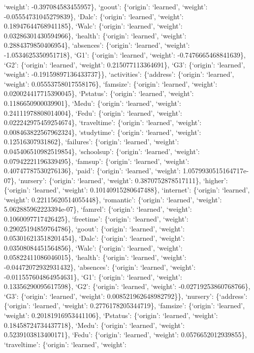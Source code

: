 \documentclass[
]{article}
\begin{document}
`weight': -0.397084583455957\}, `goout': \{`origin': `learned',
`weight': -0.05554731045279839\}, `Dalc': \{`origin': `learned',
`weight': 0.18947644768941185\}, `Walc': \{`origin': `learned',
`weight': 0.03286301430594966\}, `health': \{`origin': `learned',
`weight': 0.2884379850406954\}, `absences': \{`origin': `learned',
`weight': -1.0534625350951718\}, `G1': \{`origin': `learned', `weight':
-0.7476665468841639\}, `G2': \{`origin': `learned', `weight':
0.215077113364691\}, `G3': \{`origin': `learned', `weight':
-0.19159897136433737\}\}, `activities': \{`address': \{`origin':
`learned', `weight': 0.05553758017558176\}, `famsize': \{`origin':
`learned', `weight': 0.020024417715390045\}, `Pstatus': \{`origin':
`learned', `weight': 0.1186650900039901\}, `Medu': \{`origin':
`learned', `weight': 0.24111978808014004\}, `Fedu': \{`origin':
`learned', `weight': 0.022242975459254674\}, `traveltime': \{`origin':
`learned', `weight': 0.008463822567962324\}, `studytime': \{`origin':
`learned', `weight': 0.12516307931862\}, `failures': \{`origin':
`learned', `weight': 0.045406510982519854\}, `schoolsup': \{`origin':
`learned', `weight': 0.07942221196339495\}, `famsup': \{`origin':
`learned', `weight': 0.40747787530276136\}, `paid': \{`origin':
`learned', `weight': 1.0579930515164717e-07\}, `nursery': \{`origin':
`learned', `weight': 0.3870752878517111\}, `higher': \{`origin':
`learned', `weight': 0.10140915280647488\}, `internet': \{`origin':
`learned', `weight': 0.22115620514055448\}, `romantic': \{`origin':
`learned', `weight': 5.062885962223394e-07\}, `famrel': \{`origin':
`learned', `weight': 0.1060097717426425\}, `freetime': \{`origin':
`learned', `weight': 0.29025194859764786\}, `goout': \{`origin':
`learned', `weight': 0.053016213518201454\}, `Dalc': \{`origin':
`learned', `weight': 0.03508084451564856\}, `Walc': \{`origin':
`learned', `weight': 0.05822411086046015\}, `health': \{`origin':
`learned', `weight': -0.04472072932931432\}, `absences': \{`origin':
`learned', `weight': -0.011557604864954631\}, `G1': \{`origin':
`learned', `weight': 0.13356290095617598\}, `G2': \{`origin': `learned',
`weight': -0.02719253860768766\}, `G3': \{`origin': `learned', `weight':
0.008521962648982792\}\}, `nursery': \{`address': \{`origin': `learned',
`weight': 0.2776178205344719\}, `famsize': \{`origin': `learned',
`weight': 0.20181916953441106\}, `Pstatus': \{`origin': `learned',
`weight': 0.18458724734437718\}, `Medu': \{`origin': `learned',
`weight': 0.5239103813400171\}, `Fedu': \{`origin': `learned', `weight':
0.0576652012939855\}, `traveltime': \{`origin': `learned', `weight':
\end{document}
